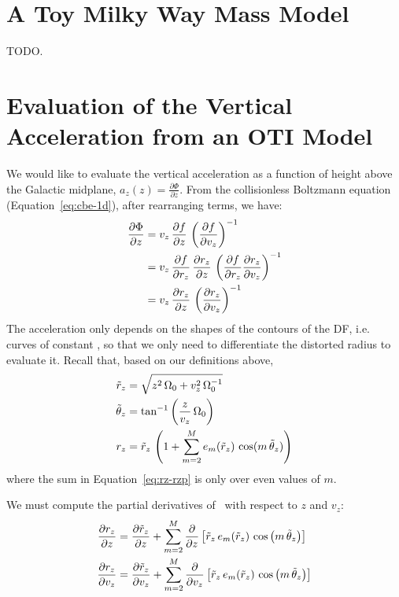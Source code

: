 \appendix

\section{A Toy Milky Way Mass Model}
\label{sec:appendix-potential}

TODO.

\section{Evaluation of the Vertical Acceleration from an OTI Model}
\label{sec:appendix-math}

We would like to evaluate the vertical acceleration as a function of height above the
Galactic midplane, $a_z(z) = \frac{\partial \Phi}{\partial z}$.
From the collisionless Boltzmann equation (Equation~\ref{eq:cbe-1d}), after rearranging
terms, we have:
\begin{align}
    \frac{\partial \Phi}{\partial z} &=
        v_z \, \frac{\partial f}{\partial z} \,
        \left( \frac{\partial f}{\partial v_z} \right)^{-1} \\
    &= v_z \, \frac{\partial f}{\partial r_z} \, \frac{\partial r_z}{\partial z} \,
        \left( \frac{\partial f}{\partial r_z} \frac{\partial r_z}{\partial v_z} \right)^{-1} \\
        &= v_z \, \frac{\partial r_z}{\partial z} \,
        \left( \frac{\partial r_z}{\partial v_z} \right)^{-1}
\end{align}
The acceleration only depends on the shapes of the contours of the DF, i.e. curves of
constant \rz, so that we only need to differentiate the distorted radius to evaluate it.
Recall that, based on our definitions above,
\begin{align}
    \tilde{r}_z &= \sqrt{z^2 \, \Omega_0 + v_z^2 \, \Omega_0^{-1}} \\
    \tilde{\theta}_z &= \tan^{-1}\left(\frac{z}{v_z} \, \Omega_0\right) \\
    r_z &= \tilde{r}_z \, \left( 1 + \sum_{m=2}^{M} e_m(\tilde{r}_z) \,
        \cos(m \, \tilde{\theta}_z) \right) \label{eq:rz-rzp}
\end{align}
where the sum in Equation~\ref{eq:rz-rzp} is only over even values of $m$.

We must compute the partial derivatives of \rz\ with respect to $z$ and $v_z$:
\begin{align}
    \frac{\partial r_z}{\partial z} &=
        \frac{\partial \tilde{r}_z}{\partial z} +
        \sum_{m=2}^{M} \frac{\partial}{\partial z} \left[\tilde{r}_z \, e_m(\tilde{r}_z) \, \cos\left(m \, \tilde{\theta}_z\right)\right]\\
    \frac{\partial r_z}{\partial v_z} &=
        \frac{\partial \tilde{r}_z}{\partial v_z} +
        \sum_{m=2}^{M} \frac{\partial}{\partial v_z} \left[\tilde{r}_z \, e_m(\tilde{r}_z) \, \cos\left(m \, \tilde{\theta}_z\right)\right]
\end{align}


